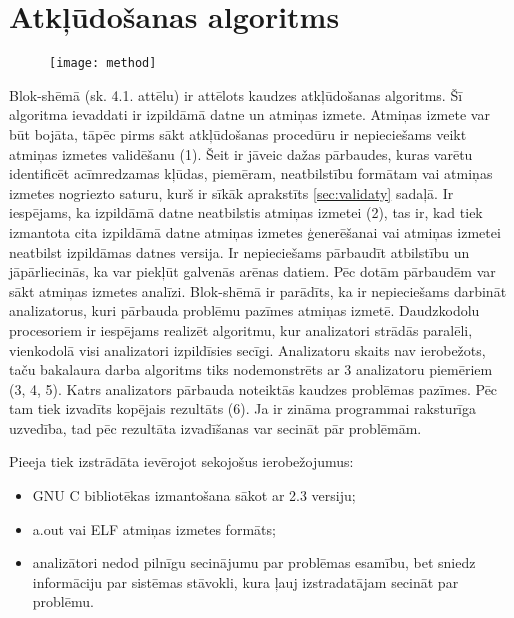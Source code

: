﻿\section{Atkļūdošanas algoritms}

 \begin{figure}[h]
\begin{center}
\texttt{[image: method]}
\end{center}
\caption{\textbf{\fontsize{11}{12}\selectfont {Uz metodi balstītā algoritma blok-shēma}}}
\end{figure}

Blok-shēmā (sk. 4.1. attēlu) ir attēlots kaudzes atkļūdošanas algoritms.
Šī algoritma ievaddati ir izpildāmā datne un atmiņas izmete.
Atmiņas izmete var būt bojāta, tāpēc pirms sākt atkļūdošanas procedūru ir nepieciešams veikt atmiņas izmetes validēšanu (1).
Šeit ir jāveic dažas pārbaudes, kuras varētu identificēt acīmredzamas kļūdas, piemēram, neatbilstību formātam vai atmiņas izmetes nogriezto saturu, kurš ir sīkāk aprakstīts \ref{sec:validaty} sadaļā.
Ir iespējams, ka izpildāmā datne neatbilstis atmiņas izmetei (2), tas ir, kad tiek izmantota cita izpildāmā datne atmiņas izmetes ģenerēšanai vai atmiņas izmetei neatbilst izpildāmas datnes versija.
Ir nepieciešams pārbaudīt atbilstību un jāpārliecinās, ka var piekļūt galvenās arēnas datiem.
Pēc dotām pārbaudēm var sākt atmiņas izmetes analīzi.
Blok-shēmā ir parādīts, ka ir nepieciešams darbināt analizatorus, kuri  pārbauda problēmu pazīmes atmiņas izmetē.
Daudzkodolu procesoriem ir iespējams realizēt algoritmu, kur analizatori strādās paralēli, vienkodolā visi analizatori izpildīsies secīgi. 
Analizatoru skaits nav ierobežots, taču bakalaura darba algoritms tiks nodemonstrēts ar 3 analizatoru piemēriem (3, 4, 5). 
Katrs analizators pārbauda noteiktās kaudzes problēmas pazīmes. 
Pēc tam tiek izvadīts kopējais rezultāts (6).
Ja ir zināma programmai raksturīga uzvedība, tad pēc rezultāta izvadīšanas var secināt pār problēmām.

Pieeja tiek izstrādāta ievērojot sekojošus ierobežojumus: %
\begin{itemize}
	\item GNU C bibliotēkas izmantošana sākot ar 2.3 versiju;
    \item a.out vai ELF atmiņas izmetes formāts;
    \item analizātori nedod pilnīgu secinājumu par problēmas esamību, bet sniedz informāciju par sistēmas stāvokli, kura ļauj izstradatājam secināt par problēmu.
\end{itemize} 



